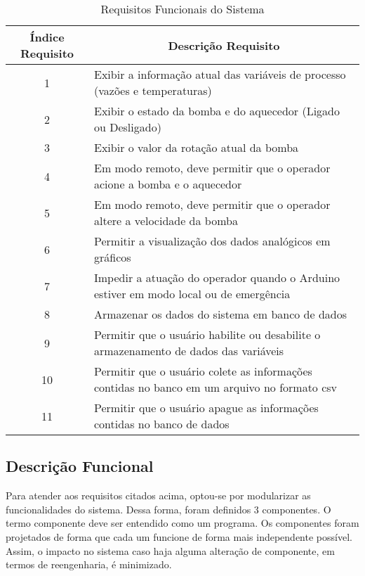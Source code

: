 		\begin{table}[!htb]
			\centering
			\caption{Requisitos Funcionais do Sistema}
			\label{tbl:requisitos}
			\def\arraystretch{1.3}
			\begin{tabular}{c p{11cm}}
				\hline
				\multicolumn{1}{c}{\textbf{Índice Requisito}} & \multicolumn{1}{c}{\textbf{Descrição Requisito}} \\ \hline 
				1 & Exibir a informação atual das variáveis de processo (vazões e temperaturas) \\ %
				2 & Exibir o estado da bomba e do aquecedor (Ligado ou Desligado) \\ %
				3 & Exibir o valor da rotação atual da bomba \\ %
				4 & Em modo remoto, deve permitir que o operador acione a bomba e o aquecedor \\ %
				5 & Em modo remoto, deve permitir que o operador altere a velocidade da bomba \\ %
				6 & Permitir a visualização dos dados analógicos em gráficos \\ %
				7 & Impedir a atuação do operador quando o Arduino estiver em modo local ou de emergência \\ %
				8 & Armazenar os dados do sistema em banco de dados \\ %
				9 & Permitir que o usuário habilite ou desabilite o armazenamento de dados das variáveis \\ %
				10 & Permitir que o usuário colete as informações contidas no banco em um arquivo no formato csv \\ %
				11 & Permitir que o usuário apague as informações contidas no banco de dados \\ \hline
			\end{tabular}
		\end{table}
		
		\subsection{Descrição Funcional}
			\label{sec:desc_funcional}
			Para atender aos requisitos citados acima, optou-se por modularizar as funcionalidades do sistema. Dessa forma, foram definidos 3 componentes. O termo componente deve ser entendido como um programa. Os componentes foram projetados de forma que cada um funcione de forma mais independente possível. Assim, o impacto no sistema caso haja alguma alteração de componente, em termos de reengenharia, é minimizado.
			
